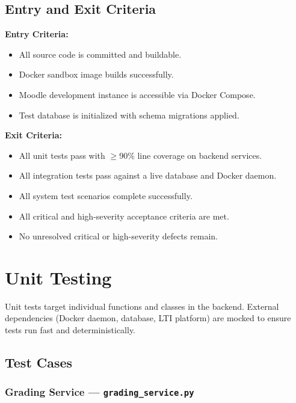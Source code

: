 \documentclass[12pt, letterpaper]{article}
\begin{document}
\subsection{Entry and Exit Criteria}

\textbf{Entry Criteria:}
\begin{itemize}
    \item All source code is committed and buildable.
    \item Docker sandbox image builds successfully.
    \item Moodle development instance is accessible via Docker Compose.
    \item Test database is initialized with schema migrations applied.
\end{itemize}

\textbf{Exit Criteria:}
\begin{itemize}
    \item All unit tests pass with $\geq$90\% line coverage on backend services.
    \item All integration tests pass against a live database and Docker daemon.
    \item All system test scenarios complete successfully.
    \item All critical and high-severity acceptance criteria are met.
    \item No unresolved critical or high-severity defects remain.
\end{itemize}

\section{Unit Testing}

Unit tests target individual functions and classes in the backend. External dependencies (Docker daemon, database, LTI platform) are mocked to ensure tests run fast and deterministically.

\subsection{Test Cases}

\subsubsection{Grading Service --- \texttt{grading\_service.py}}
\end{document}
